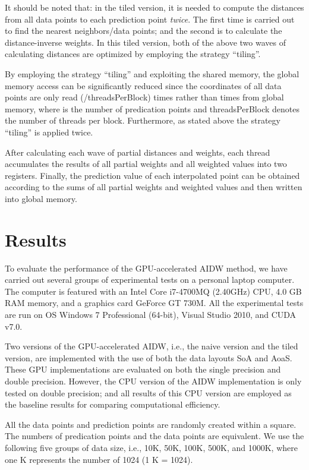 \documentclass[fleqn,11pt]{wlscirep}
\begin{document}
It should be noted that: in the tiled version, it is needed to compute the 
distances from all data points to each prediction point \textit{twice}. The first time is 
carried out to find the  nearest neighbors/data points; and the second is 
to calculate the distance-inverse weights. In this tiled version, both of 
the above two waves of calculating distances are optimized by employing the 
strategy ``tiling''.

By employing the strategy ``tiling'' and exploiting the shared memory, the 
global memory access can be significantly reduced since the coordinates of 
all data points are only read (/threadsPerBlock) times rather than  times 
from global memory, where  is the number of predication points and 
threadsPerBlock denotes the number of threads per block. Furthermore, as 
stated above the strategy ``tiling'' is applied twice.

After calculating each wave of partial distances and weights, each thread 
accumulates the results of all partial weights and all weighted values into 
two registers. Finally, the prediction value of each interpolated point can 
be obtained according to the sums of all partial weights and weighted values 
and then written into global memory.

\section{Results}\label{sec4}
To evaluate the performance of the GPU-accelerated AIDW method, we have 
carried out several groups of experimental tests on a personal laptop 
computer. The computer is featured with an Intel Core i7-4700MQ (2.40GHz) 
CPU, 4.0 GB RAM memory, and a graphics card GeForce GT 730M. All the 
experimental tests are run on OS Windows 7 Professional (64-bit), Visual 
Studio 2010, and CUDA v7.0.

Two versions of the GPU-accelerated AIDW, i.e., the naive version and the 
tiled version, are implemented with the use of both the data layouts SoA and 
AoaS. These GPU implementations are evaluated on both the single precision 
and double precision. However, the CPU version of the AIDW implementation is 
only tested on double precision; and all results of this CPU version are 
employed as the baseline results for comparing computational efficiency. 

All the data points and prediction points are randomly created within a 
square. The numbers of predication points and the data points are 
equivalent. We use the following five groups of data size, i.e., 10K, 50K, 
100K, 500K, and 1000K, where one K represents the number of 1024 (1 K = 
1024). 
\end{document}
